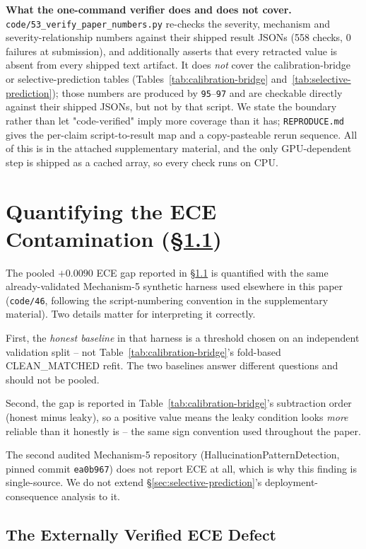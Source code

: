 \documentclass{article}
\begin{document}
\textbf{What the one-command verifier does and does not cover.}
\texttt{code/53\_verify\_paper\_numbers.py} re-checks the severity, mechanism
and severity-relationship numbers against their shipped result JSONs (558
checks, 0 failures at submission), and additionally asserts that every
retracted value is absent from every shipped text artifact. It does
\emph{not} cover the calibration-bridge or selective-prediction tables
(Tables~\ref{tab:calibration-bridge} and~\ref{tab:selective-prediction});
those numbers are produced by \texttt{95}--\texttt{97} and are checkable
directly against their shipped JSONs, but not by that script. We state the
boundary rather than let "code-verified" imply more coverage than it has; \texttt{REPRODUCE.md} gives the
per-claim script-to-result map and a copy-pasteable rerun sequence. All of
this is in the attached supplementary material, and the only GPU-dependent
step is shipped as a cached array, so every check runs on CPU.

\section{Quantifying the ECE Contamination (\S\ref{sec:mechanism5-ece})}
\label{app:ece}

The pooled $+0.0090$ ECE gap reported in \S\ref{sec:mechanism5-ece} is
quantified with the same already-validated Mechanism-5 synthetic harness used
elsewhere in this paper (\texttt{code/46}, following the script-numbering
convention in the supplementary material). Two details matter for
interpreting it correctly.

First, the \emph{honest baseline} in that harness is a threshold chosen on an
independent validation split -- not Table~\ref{tab:calibration-bridge}'s
fold-based CLEAN\_MATCHED refit. The two baselines answer different questions
and should not be pooled.

Second, the gap is reported in Table~\ref{tab:calibration-bridge}'s subtraction
order (honest minus leaky), so a positive value means the leaky condition looks
\emph{more} reliable than it honestly is -- the same sign convention used
throughout the paper.

The second audited Mechanism-5 repository (HallucinationPatternDetection,
pinned commit \texttt{ea0b967}) does not report ECE at all, which is why this
finding is single-source. We do not extend
\S\ref{sec:selective-prediction}'s deployment-consequence analysis to it.

\subsection{The Externally Verified ECE Defect}
\label{sec:mechanism5-ece}
\end{document}
